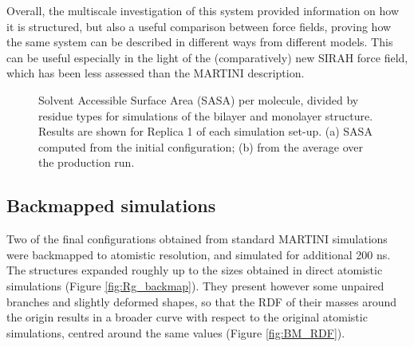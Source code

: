 Overall, the multiscale investigation of this system provided information on how it is structured, but also a useful comparison between force fields, proving how the same system can be described in different ways from different models. This can be useful especially in the light of the (comparatively) new SIRAH force field, which has been less assessed than the MARTINI description.
%
\begin{figure}[t!]
\centering
{} 
\caption[SASA per residue of monolayer and bilater]{Solvent Accessible Surface Area (SASA) per molecule, divided by residue types for simulations of the bilayer and monolayer structure. Results are shown for Replica 1 of each simulation set-up. (a) SASA computed from the initial configuration; (b) from the average over the production run.}
\label{fig:mono_bi_sasa}
\end{figure}


\subsection{Backmapped simulations} 

Two of the final configurations obtained from standard MARTINI simulations were backmapped to atomistic resolution, and simulated for additional 200 ns. The structures expanded roughly up to the sizes obtained in direct atomistic simulations (Figure \ref{fig:Rg_backmap}). They present however some unpaired branches and slightly deformed shapes, so that the RDF of their masses around the origin results in a broader curve with respect to the original atomistic simulations, centred around the same values (Figure \ref{fig:BM_RDF}).


